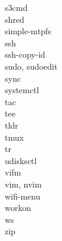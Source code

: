 \documentclass [8pt] {extarticle}
\begin{document}
    s3cmd \\
    shred \\
    simple-mtpfs \\
    ssh \\
    ssh-copy-id \\
    sudo, sudoedit \\
    sync \\
    systemctl \\
    tac \\
    tee \\
    tldr \\
    tmux \\
    tr \\
    udisksctl \\
    vifm \\
    vim, nvim \\
    wifi-menu \\
    workon \\
    ws \\
    zip \\
\end{document}

